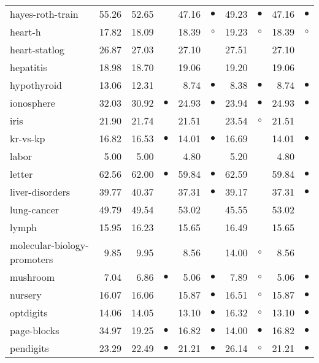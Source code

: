 {\begin{longtable}{lrr@{\hspace{0.1cm}}cr@{\hspace{0.1cm}}cr@{\hspace{0.1cm}}cr@{\hspace{0.1cm}}c}
hayes-roth-train & 55.26 & 52.65 &           & 47.16 & $\bullet$ & 49.23 &  $\bullet$ & 47.16 & $\bullet$\\
heart-h & 17.82 & 18.09 &           & 18.39 &   $\circ$ & 19.23 &    $\circ$ & 18.39 &   $\circ$\\
heart-statlog & 26.87 & 27.03 &           & 27.10 &           & 27.51 &            & 27.10 &          \\
hepatitis & 18.98 & 18.70 &           & 19.06 &           & 19.20 &            & 19.06 &          \\
hypothyroid & 13.06 & 12.31 &           &  8.74 & $\bullet$ &  8.38 &  $\bullet$ &  8.74 & $\bullet$\\
ionosphere & 32.03 & 30.92 & $\bullet$ & 24.93 & $\bullet$ & 23.94 &  $\bullet$ & 24.93 & $\bullet$\\
iris & 21.90 & 21.74 &           & 21.51 &           & 23.54 &    $\circ$ & 21.51 &          \\
kr-vs-kp & 16.82 & 16.53 & $\bullet$ & 14.01 & $\bullet$ & 16.69 &            & 14.01 & $\bullet$\\
labor &  5.00 &  5.00 &           &  4.80 &           &  5.20 &            &  4.80 &          \\
letter & 62.56 & 62.00 & $\bullet$ & 59.84 & $\bullet$ & 62.59 &            & 59.84 & $\bullet$\\
liver-disorders & 39.77 & 40.37 &           & 37.31 & $\bullet$ & 39.17 &            & 37.31 & $\bullet$\\
lung-cancer & 49.79 & 49.54 &           & 53.02 &           & 45.55 &            & 53.02 &          \\
lymph & 15.95 & 16.23 &           & 15.65 &           & 16.49 &            & 15.65 &          \\
molecular-biology-promoters &  9.85 &  9.95 &           &  8.56 &           & 14.00 &    $\circ$ &  8.56 &          \\
mushroom &  7.04 &  6.86 & $\bullet$ &  5.06 & $\bullet$ &  7.89 &    $\circ$ &  5.06 & $\bullet$\\
nursery & 16.07 & 16.06 &           & 15.87 & $\bullet$ & 16.51 &    $\circ$ & 15.87 & $\bullet$\\
optdigits & 14.06 & 14.05 &           & 13.10 & $\bullet$ & 16.32 &    $\circ$ & 13.10 & $\bullet$\\
page-blocks & 34.97 & 19.25 & $\bullet$ & 16.82 & $\bullet$ & 14.00 &  $\bullet$ & 16.82 & $\bullet$\\
pendigits & 23.29 & 22.49 & $\bullet$ & 21.21 & $\bullet$ & 26.14 &    $\circ$ & 21.21 & $\bullet$\\

\end{longtable}}
